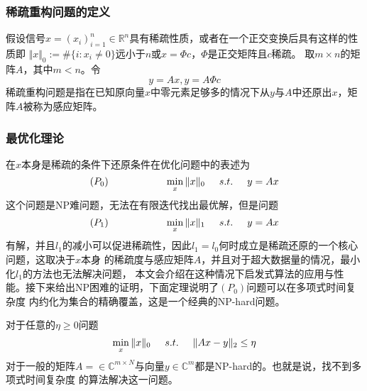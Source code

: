 \subsubsection{稀疏重构问题的定义}
假设信号$x=\left(x_i\right)^n_{i=1}\in \mathbb{R}^n$具有稀疏性质，或者在一个正交变换后具有这样的性质即
$\Vert x\Vert_0:=\# \{i:x_i \neq 0\}$远小于$n$或$x=\Phi c$，$\Phi$是正交矩阵且$c$稀疏。
取$m\times n$的矩阵$A$，其中$m<n$。令
\begin{equation}
    y=Ax,y=A\Phi c
\end{equation}
稀疏重构问题是指在已知原向量$x$中零元素足够多的情况下从$y$与$A$中还原出$x$，矩阵$A$被称为感应矩阵。

\subsubsection{最优化理论}
在$x$本身是稀疏的条件下还原条件在优化问题中的表述为
\begin{equation}
    \left( P_0\right) \hspace{2cm}\min_x\Vert x\Vert_0\hspace{0.5cm} s.t.\hspace{0.5cm} y=Ax
\end{equation}
这个问题是NP难问题，无法在有限迭代找出最优解，但是问题
\begin{equation}
    \left( P_1\right) \hspace{2cm}\min_x\Vert x\Vert_1\hspace{0.5cm} s.t.\hspace{0.5cm} y=Ax
\end{equation}
有解，并且$l_1$的减小可以促进稀疏性，因此$l_1=l_0$何时成立是稀疏还原的一个核心问题，这取决于$x$本身
的稀疏度与感应矩阵$A$，并且对于超大数据量的情况，最小化$l_1$的方法也无法解决问题，
本文会介绍在这种情况下启发式算法的应用与性能。接下来给出NP困难的证明，下面定理说明了$(P_0)$问题可以在多项式时间复杂度
内约化为集合的精确覆盖，这是一个经典的NP-hard问题。
\begin{theorem}
    对于任意的$\eta\ge 0$问题
    \begin{equation}
        \min_x\Vert x\Vert_0\hspace{0.5cm} s.t.\hspace{0.5cm} \Vert Ax-y\Vert_2\le \eta
    \end{equation}
    对于一般的矩阵$A=\in\mathbb{C}^{m \times N}$与向量$y\in\mathbb{C}^m$都是NP-hard的。也就是说，找不到多项式时间复杂度
    的算法解决这一问题。
\end{theorem}

